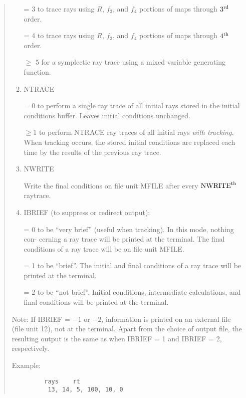 \begin{quotation}
\begin{enumerate}
             = 3 to trace rays using $R$, $f_3$, and $f_4$ portions of maps
			   through $3^{\mbox{\scriptsize rd}}$ order.

             = 4 to trace rays using $R$, $f_3$, and $f_4$ portions of maps through
               $4^{\mbox{\scriptsize th}}$ order.

			 $\geq$ 5 for a symplectic ray trace using a mixed variable generating
			 function.


      \item  NTRACE

             = 0 to perform a single ray trace of all initial rays stored in the
             initial \hspace*{1em}conditions buffer.  Leaves initial conditions
             unchanged.

             $\geq 1$ to perform NTRACE ray traces of all initial rays {\em with
               tracking}.  When \hspace*{1em} tracking occurs, the stored initial
               conditions are replaced each time by \hspace*{1em}the results of the
               previous ray trace.
      \item  NWRITE

             Write the final conditions on file unit MFILE after every
             $\mbox{NWRITE}^{\mbox{\scriptsize th}}$ raytrace.

      \item  IBRIEF (to suppress or redirect output):

             = 0 to be ``very brief'' (useful when tracking).  In this mode,
               nothing con- \hspace*{1em}cerning a ray trace will be printed at the
               terminal.  The final conditions \hspace*{1em}of a ray trace will be on
               file unit MFILE.

             = 1 to be ``brief''.  The initial and final conditions of a ray
               trace will be \hspace*{1em}printed at the terminal.

             = 2 to be ``not brief''.  Initial conditions, intermediate
               calculations, and final \hspace*{1em}conditions will be printed at the
               terminal.
\end{enumerate}
\vspace{5mm}

             Note: If IBRIEF = $-1$ or $-2$, information is printed on an
external file (file unit 12), not at the terminal.  Apart from the choice
of output file, the resulting output is the same as when IBRIEF = 1 and
IBRIEF = 2, respectively.
\vspace{5mm}

\noindent     Example:
\begin{verbatim}
         rays    rt
          13, 14, 5, 100, 10, 0
\end{verbatim}
\end{quotation}

